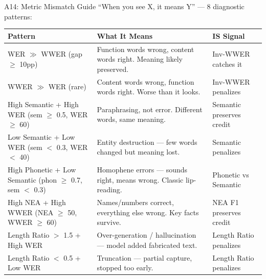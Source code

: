 \begin{frame}[shrink=10]{A14: Metric Mismatch Guide}
  {\small ``When you see X, it means Y'' --- 8 diagnostic patterns:}

  \vspace{4pt}

  {\scriptsize
  \begin{tabular}{@{}p{3.5cm}p{5cm}p{3cm}@{}}
    \toprule
    \textbf{Pattern} & \textbf{What It Means} & \textbf{IS Signal} \\
    \midrule
    \alert{WER $\gg$ WWER} (gap $\geq$ 10pp) &
    Function words wrong, content words right. Meaning likely preserved. &
    Inv-WWER catches it \\[3pt]
    WWER $\gg$ WER (rare) &
    Content words wrong, function words right. \alert{Worse than it looks.} &
    Inv-WWER penalizes \\[3pt]
    High Semantic + High WER (sem $\geq$ 0.5, WER $\geq$ 60) &
    Paraphrasing, not error. Different words, same meaning. &
    Semantic preserves credit \\[3pt]
    Low Semantic + Low WER (sem $<$ 0.3, WER $<$ 40) &
    \alert{Entity destruction} --- few words changed but meaning lost. &
    Semantic penalizes \\[3pt]
    High Phonetic + Low Semantic (phon $\geq$ 0.7, sem $<$ 0.3) &
    Homophene errors --- sounds right, means wrong. Classic lip-reading. &
    Phonetic vs Semantic \\[3pt]
    High NEA + High WWER (NEA $\geq$ 50, WWER $\geq$ 60) &
    Names/numbers correct, everything else wrong. Key facts survive. &
    NEA F1 preserves credit \\[3pt]
    Length Ratio $>$ 1.5 + High WER &
    Over-generation / hallucination --- model added fabricated text. &
    Length Ratio penalizes \\[3pt]
    Length Ratio $<$ 0.5 + Low WER &
    Truncation --- partial capture, stopped too early. &
    Length Ratio penalizes \\
    \bottomrule
  \end{tabular}}

  \vspace{4pt}

\end{frame}

